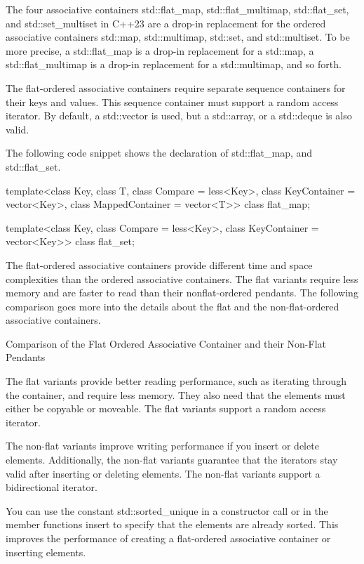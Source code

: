 The four associative containers std::flat\_map, std::flat\_multimap, std::flat\_set, and std::set\_multiset in C++23 are a drop-in replacement for the ordered associative containers std::map, std::multimap, std::set, and std::multiset. To be more precise, a std::flat\_map is a drop-in replacement for a std::map, a std::flat\_multimap is a drop-in replacement for a std::multimap, and so forth.

The flat-ordered associative containers require separate sequence containers for their keys and values. This sequence container must support a random access iterator. By default, a std::vector is used, but a std::array, or a std::deque is also valid.

The following code snippet shows the declaration of std::flat\_map, and std::flat\_set.


\begin{cpp}
template<class Key, class T,
	class Compare = less<Key>,
	class KeyContainer = vector<Key>, class MappedContainer = vector<T>>
class flat_map;

template<class Key,
	class Compare = less<Key>,
	class KeyContainer = vector<Key>>
class flat_set;
\end{cpp}

The flat-ordered associative containers provide different time and space complexities than the ordered associative containers. The flat variants require less memory and are faster to read than their nonflat-ordered pendants. The following comparison goes more into the details about the flat and the non-flat-ordered associative containers.


\begin{myTip}{Comparison of the Flat Ordered Associative Container and their Non-Flat Pendants}

The flat variants provide better reading performance, such as iterating through the container, and require less memory. They also need that the elements must either be copyable or moveable. The flat variants support a random access iterator.

The non-flat variants improve writing performance if you insert or delete elements. Additionally, the non-flat variants guarantee that the iterators stay valid after inserting or deleting elements. The non-flat variants support a bidirectional iterator.
\end{myTip}



You can use the constant std::sorted\_unique in a constructor call or in the member functions insert to specify that the elements are already sorted. This improves the performance of creating a flat-ordered associative container or inserting elements.

